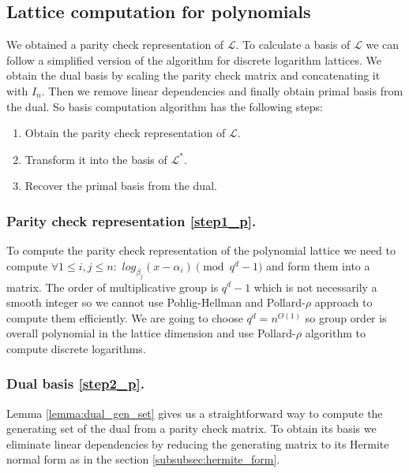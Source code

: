 \documentclass[12pt]{article}
\newcommand{\LL}{\mathcal{L}}
\begin{document}
\subsection{Lattice computation for polynomials}
\label{subsec:compute_basis_polynomials}


We obtained a parity check representation of $\LL$.
To calculate a basis of $\LL$ we can follow a simplified version of the algorithm for discrete logarithm lattices. We obtain the dual basis by scaling the parity check matrix and concatenating it with $I_{n}$. Then we remove linear dependencies and finally obtain primal basis from the dual. So basis computation algorithm has the following steps:

\begin{enumerate}
    \item \label{step1_p} Obtain the parity check representation of $\LL$.
    \item \label{step2_p} Transform it into the basis of $\LL^{*}$.
    \item \label{step3_p} Recover the primal basis from the dual.
\end{enumerate}

\subsubsection{Parity check representation \ref{step1_p}.}
\label{subsubsec:parity_check_polynomials}
To compute the parity check representation of the polynomial lattice we need to compute
$\forall 1 \leq i,j \leq n :$ $log_{\beta_j}(x - \alpha_i) \pmod{q^{d} -1}$ and form them into a matrix. The order of multiplicative group is $q^{d} - 1$ which is not necessarily a smooth integer so we cannot use Pohlig-Hellman \cite{[PH78]} and Pollard-$\rho$ \cite{[Pol78]} approach to compute them efficiently. We are going to choose $q^{d} = n^{O(1)}$ so group order is overall polynomial in the lattice dimension and use Pollard-$\rho$ \cite{[Pol78]} algorithm to compute discrete logarithms.

\subsubsection{Dual basis \ref{step2_p}.}
\label{subsubsec:dual_gen_set_polynomials}

Lemma \ref{lemma:dual_gen_set} gives us a straightforward way to compute the generating set of the dual from a parity check matrix. To obtain its basis we eliminate linear dependencies by reducing the generating matrix to its Hermite normal form as in the section \ref{subsubsec:hermite_form}.
\end{document}

